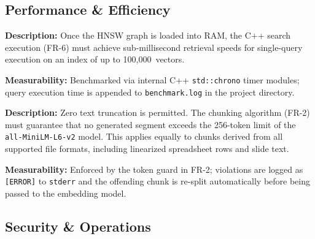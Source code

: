 \documentclass[12pt, a4paper]{article}
\begin{document}
\subsection{Performance \& Efficiency}

\begin{tcolorbox}[enhanced, colback=white, colframe=ctGold,
    colbacktitle=ctLightGold, coltitle=ctPurple, boxrule=0.5pt,
    leftrule=4pt, arc=2mm, fonttitle=\large\bfseries,
    title={NFR-1: Retrieval Latency},
    drop fuzzy shadow=black!5!white]
\begin{prolist}
    \item \textbf{Description:} Once the HNSW graph is loaded into RAM, the
    C++ search execution (FR-6) must achieve sub-millisecond retrieval
    speeds for single-query execution on an index of up to 100,000~vectors.

    \item \textbf{Measurability:} Benchmarked via internal C++
    \texttt{std::chrono} timer modules; query execution time is appended to
    \texttt{benchmark.log} in the project directory.
\end{prolist}
\end{tcolorbox}

\begin{tcolorbox}[enhanced, colback=white, colframe=ctGold,
    colbacktitle=ctLightGold, coltitle=ctPurple, boxrule=0.5pt,
    leftrule=4pt, arc=2mm, fonttitle=\large\bfseries,
    title={NFR-2: Context Integrity},
    drop fuzzy shadow=black!5!white]
\begin{prolist}
    \item \textbf{Description:} Zero text truncation is permitted. The
    chunking algorithm (FR-2) must guarantee that no generated segment
    exceeds the 256-token limit of the \texttt{all-MiniLM-L6-v2} model.
    This applies equally to chunks derived from all supported file formats,
    including linearized spreadsheet rows and slide text.

    \item \textbf{Measurability:} Enforced by the token guard in FR-2;
    violations are logged as \texttt{[ERROR]} to \texttt{stderr} and the
    offending chunk is re-split automatically before being passed to the
    embedding model.
\end{prolist}
\end{tcolorbox}

\subsection{Security \& Operations}
\end{document}
